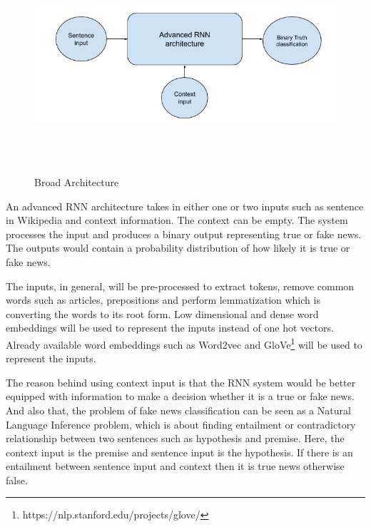 \documentclass[a4paper, 11pt]{article}
\begin{document}
\begin{figure}[htpb]
    \centering
    \includegraphics[width=\textwidth,height=8cm,keepaspectratio=true]
    {broad-architecture-diagram.png}
    \caption{
        Broad Architecture
    }
    \label{fig:broad_architecture}
\end{figure}

An advanced RNN architecture takes in either one or two inputs such as sentence in Wikipedia and context information. The context can be empty. The system processes the input and produces a binary output representing true or fake news. The outputs would contain a probability distribution of how likely it is true or fake news.

The inputs, in general, will be pre-processed to extract tokens, remove common words such as articles, prepositions and perform lemmatization which is converting the words to its root form. Low dimensional and dense word embeddings will be used to represent the inputs instead of one hot vectors. Already available word embeddings such as Word2vec\cite{Mikolov2013} and GloVe\footnote{https://nlp.stanford.edu/projects/glove/} will be used to represent the inputs.

The reason behind using context input is that the RNN system would be better equipped with information to make a decision whether it is a true or fake news. And also that, the problem of fake news classification can be seen as a Natural Language Inference \cite{Parikh2016} problem, which is about finding entailment or contradictory relationship between two sentences such as hypothesis and premise. Here, the context input is the premise and sentence input is the hypothesis. If there is an entailment between sentence input and context then it is true news otherwise false.
\end{document}
